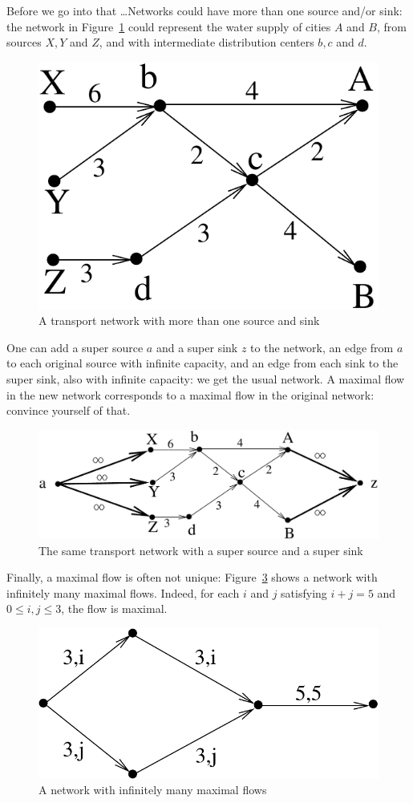 Before we go into that \ldots Networks could have more than one source
and/or sink: the network in Figure~\ref{transport2} could represent
the water supply of cities $A$ and $B$, from sources $X,Y$ and $Z$,
and with intermediate distribution centers $b,c$ and $d$.

\begin{figure}[ht]
	\centering
	\includegraphics[width=0.22\linewidth,keepaspectratio]{transport2} %
	\caption{A transport network with more than one source and sink \label{transport2}}
\end{figure}

One can add a super source $a$ and a super sink $z$ to the network, an
edge from $a$ to each original source with infinite capacity, and an
edge from each sink to the super sink, also with infinite capacity: we
get the usual network. A maximal flow in the new network corresponds to a maximal flow in the
original network: convince yourself of that.

\begin{figure}[ht]
	\centering
	\includegraphics[width=0.507\linewidth,keepaspectratio]{transport3} %
	\caption{The same transport network with a super source and a
	super sink \label{transport3}}
\end{figure}

Finally, a maximal flow is often not unique: Figure~\ref{stroom3}
shows a network with infinitely many maximal flows. Indeed, for each
$i$ and $j$ satisfying $i+j = 5$ and $0 \leq i,j \leq 3$, the flow is
maximal.

\begin{figure}[ht]
	\centering
	\includegraphics[width=0.3\linewidth,keepaspectratio]{stroom3} %
	\caption{A network with infinitely many maximal flows\label{stroom3}}
\end{figure}


